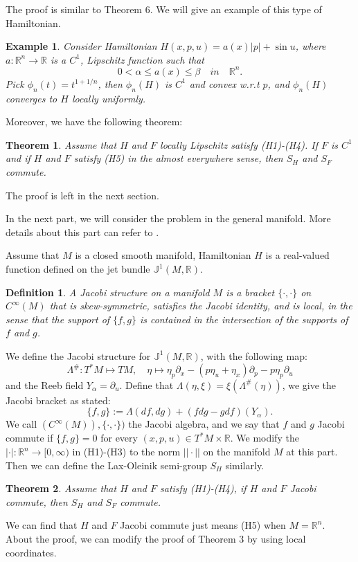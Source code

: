 \documentclass[preprint]{elsarticle}
\newtheorem{result}{\textbf{Theorem}}
\newtheorem{definition}{Definition}[section]
\newtheorem{example}{Example}[section]
\numberwithin{equation}{section}
\begin{document}
The proof is similar to Theorem 6. We will give an example of this type of Hamiltonian.
\begin{example}
    Consider Hamiltonian $H(x,p,u)=a(x)|p|+\sin u$, where $a:\mathbb R^n \rightarrow \mathbb R$ is a $C^1$, Lipschitz function such that
    \begin{equation*}
        0<\alpha \leq a(x)\leq \beta \quad in \quad \mathbb R^n.
    \end{equation*}
    Pick $\phi_n(t)=t^{1+1/n}$, then $\phi_n(H)$ is $C^1$ and convex w.r.t $p$, and $\phi_n(H)$ converges to $H$ locally uniformly.
\end{example}
Moreover, we have the following theorem:
\begin{result}
    Assume that $H$ and $F$ locally Lipschitz satisfy (H1)-(H4). If $F$ is $C^1$ and if $H$ and $F$ satisfy (H5) in the almost everywhere sense, then $S_H$ and $S_F$ commute.
\end{result}
The proof is left in the next section.

In the next part, we will consider the problem in the general manifold. More details about this part can refer to \cite{SF}.

Assume that $M$ is a closed smooth manifold, Hamiltonian $H$ is a real-valued function defined on the jet bundle $\mathbb J^1(M,\mathbb R)$. 
\begin{definition}
    A Jacobi structure on a manifold $M$ is a bracket $\{\cdot,\cdot\}$ on $C^{\infty}(M)$ that is skew-symmetric, satisfies the Jacobi identity, and is local, in the sense that the support of $\{f, g\}$ is contained in the intersection of the supports of $f$ and $g$.
\end{definition}
We define the Jacobi structure for $\mathbb J^1(M,\mathbb R)$, with the following map:
\begin{equation}
    \Lambda ^\#: T^*M \mapsto TM, \quad \eta \mapsto \eta_p\partial_x-(p\eta_u+\eta_x)\partial_p-p\eta_p\partial_u
\end{equation}
and the Reeb field $Y_\alpha =\partial_u$. Define that $\Lambda(\eta,\xi)=\xi(\Lambda ^\#(\eta))$, we give the Jacobi bracket as stated:
\begin{equation}
    \{f,g\}:=\Lambda(df,dg)+(fdg-gdf)(Y_\alpha).
\end{equation}
We call $(C^{\infty}(M)),\{\cdot,\cdot\})$ the Jacobi algebra, and we say that $f$ and $g$ Jacobi commute if $\{f,g\}=0$ for every $(x,p,u)\in T^*M\times \mathbb R$. We modify the $|\cdot|:\mathbb R^n \rightarrow [0,\infty)$ in (H1)-(H3) to the norm $||\cdot||$ on the manifold $M$ at this part. Then we can define the Lax-Oleinik semi-group $S_H$ similarly.  
\begin{result}
    Assume that $H$ and $F$ satisfy (H1)-(H4), if $H$ and $F$ Jacobi commute, then $S_H$ and $S_F$ commute.
\end{result}
We can find that $H$ and $F$ Jacobi commute just means (H5) when $M=\mathbb R^n$. About the proof, we can modify the proof of Theorem 3 by using local coordinates. 
\end{document}
